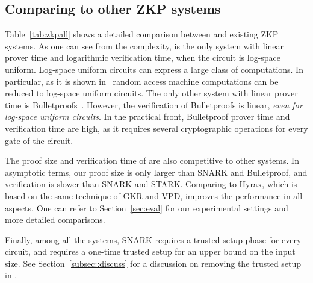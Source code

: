 \subsection{Comparing to other ZKP systems} Table~\ref{tab:zkpall} shows a detailed comparison between \name and existing ZKP systems. As one can see from the complexity, \name is the only system with linear prover time and logarithmic verification time, when the circuit is log-space uniform. Log-space uniform circuits can express a large class of computations. In particular, as it is shown in~\cite{libsnark,vram,libstark}  random access machine computations can be reduced to log-space uniform circuits. The only other system with linear prover time is Bulletproofs~\cite{bulletproofs}. However, the verification of Bulletproofs is linear, \emph{even for log-space uniform circuits}. In the practical front, Bulletproof prover time and verification time are high, as it requires several cryptographic operations for every gate of the circuit.

The proof size and verification time of \name are also competitive to other systems. In asymptotic terms, our proof size is only larger than SNARK and Bulletproof, and verification is slower than SNARK and STARK. Comparing to Hyrax, which is based on the same technique of GKR and VPD, \name improves the performance in all aspects. One can refer to Section~\ref{sec:eval} for our experimental settings and more detailed comparisons. 
 
Finally, among all the systems, SNARK requires a trusted setup phase for every circuit, and \name requires a one-time trusted setup for an upper bound on the input size. See Section~\ref{subsec::discuss} for a discussion on removing the trusted setup in \name. 




